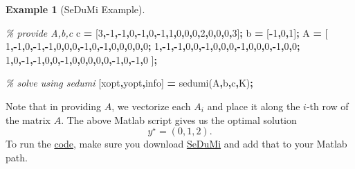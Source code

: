 \documentclass[
]{book}
\newenvironment{Shaded}{\begin{snugshade}}{\end{snugshade}}
\newcommand{\CommentTok}[1]{\textcolor[rgb]{0.56,0.35,0.01}{\textit{#1}}}
\newcommand{\FloatTok}[1]{\textcolor[rgb]{0.00,0.00,0.81}{#1}}
\newcommand{\NormalTok}[1]{#1}
\newcommand{\OperatorTok}[1]{\textcolor[rgb]{0.81,0.36,0.00}{\textbf{#1}}}
\newcommand{\VariableTok}[1]{\textcolor[rgb]{0.00,0.00,0.00}{#1}}
\theoremstyle{definition}
\theoremstyle{definition}
\newtheorem{example}{Example}[chapter]
\theoremstyle{definition}
\theoremstyle{definition}
\theoremstyle{remark}
\begin{document}
\begin{example}[SeDuMi Example]
\begin{Shaded}
\begin{Highlighting}[]
\CommentTok{\% provide A,b,c}
\VariableTok{c} \OperatorTok{=}\NormalTok{ [}\FloatTok{3}\OperatorTok{,{-}}\FloatTok{1}\OperatorTok{,{-}}\FloatTok{1}\OperatorTok{,}\FloatTok{0}\OperatorTok{,{-}}\FloatTok{1}\OperatorTok{,}\FloatTok{0}\OperatorTok{,{-}}\FloatTok{1}\OperatorTok{,}\FloatTok{1}\OperatorTok{,}\FloatTok{0}\OperatorTok{,}\FloatTok{0}\OperatorTok{,}\FloatTok{0}\OperatorTok{,}\FloatTok{2}\OperatorTok{,}\FloatTok{0}\OperatorTok{,}\FloatTok{0}\OperatorTok{,}\FloatTok{0}\OperatorTok{,}\FloatTok{3}\NormalTok{]}\OperatorTok{;}
\VariableTok{b} \OperatorTok{=}\NormalTok{ [}\OperatorTok{{-}}\FloatTok{1}\OperatorTok{,}\FloatTok{0}\OperatorTok{,}\FloatTok{1}\NormalTok{]}\OperatorTok{;}
\VariableTok{A} \OperatorTok{=}\NormalTok{ [}
    \FloatTok{1}\OperatorTok{,{-}}\FloatTok{1}\OperatorTok{,}\FloatTok{0}\OperatorTok{,{-}}\FloatTok{1}\OperatorTok{,{-}}\FloatTok{1}\OperatorTok{,}\FloatTok{0}\OperatorTok{,}\FloatTok{0}\OperatorTok{,}\FloatTok{0}\OperatorTok{,{-}}\FloatTok{1}\OperatorTok{,}\FloatTok{0}\OperatorTok{,{-}}\FloatTok{1}\OperatorTok{,}\FloatTok{0}\OperatorTok{,}\FloatTok{0}\OperatorTok{,}\FloatTok{0}\OperatorTok{,}\FloatTok{0}\OperatorTok{,}\FloatTok{0}\OperatorTok{;}
    \FloatTok{1}\OperatorTok{,{-}}\FloatTok{1}\OperatorTok{,{-}}\FloatTok{1}\OperatorTok{,}\FloatTok{0}\OperatorTok{,}\FloatTok{0}\OperatorTok{,{-}}\FloatTok{1}\OperatorTok{,}\FloatTok{0}\OperatorTok{,}\FloatTok{0}\OperatorTok{,}\FloatTok{0}\OperatorTok{,{-}}\FloatTok{1}\OperatorTok{,}\FloatTok{0}\OperatorTok{,}\FloatTok{0}\OperatorTok{,}\FloatTok{0}\OperatorTok{,{-}}\FloatTok{1}\OperatorTok{,}\FloatTok{0}\OperatorTok{,}\FloatTok{0}\OperatorTok{;}
    \FloatTok{1}\OperatorTok{,}\FloatTok{0}\OperatorTok{,{-}}\FloatTok{1}\OperatorTok{,{-}}\FloatTok{1}\OperatorTok{,}\FloatTok{0}\OperatorTok{,}\FloatTok{0}\OperatorTok{,{-}}\FloatTok{1}\OperatorTok{,}\FloatTok{0}\OperatorTok{,}\FloatTok{0}\OperatorTok{,}\FloatTok{0}\OperatorTok{,}\FloatTok{0}\OperatorTok{,}\FloatTok{0}\OperatorTok{,{-}}\FloatTok{1}\OperatorTok{,}\FloatTok{0}\OperatorTok{,{-}}\FloatTok{1}\OperatorTok{,}\FloatTok{0}
\NormalTok{    ]}\OperatorTok{;}

\CommentTok{\% solve using sedumi}
\NormalTok{[}\VariableTok{xopt}\OperatorTok{,}\VariableTok{yopt}\OperatorTok{,}\VariableTok{info}\NormalTok{] }\OperatorTok{=} \VariableTok{sedumi}\NormalTok{(}\VariableTok{A}\OperatorTok{,}\VariableTok{b}\OperatorTok{,}\VariableTok{c}\OperatorTok{,}\VariableTok{K}\NormalTok{)}\OperatorTok{;}
\end{Highlighting}
\end{Shaded}

Note that in providing \(A\), we vectorize each \(A_i\) and place it along the \(i\)-th row of the matrix \(A\).
The above Matlab script gives us the optimal solution
\[
y^\star = (0,1,2).
\]
To run the \href{https://github.com/ComputationalRobotics/Semidefinite-Examples/blob/main/sedumi_example.m}{code}, make sure you download \href{https://github.com/sqlp/sedumi}{SeDuMi} and add that to your Matlab path.
\end{example}
\end{document}
